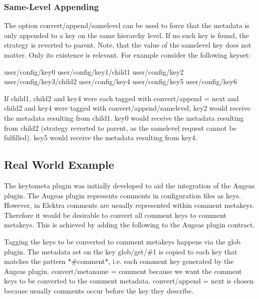 \subsubsection*{Same-\/\+Level Appending}

The option {\ttfamily convert/append/samelevel} can be used to force that the metadata is only appended to a key on the same hierarchy level. If no such key is found, the strategy is reverted to parent. Note, that the value of the samelevel key does not matter. Only its existence is relevant. For example consider the following keyset\+: \begin{DoxyVerb}user/config/key0
user/config/key1/child1
user/config/key2
user/config/key3/child2
user/config/key4
user/config/key5
user/config/key6
\end{DoxyVerb}


If child1, child2 and key4 were each tagged with {\ttfamily convert/append = next} and child2 and key4 were tagged with {\ttfamily convert/append/samelevel}, key2 would receive the metadata resulting from child1. key0 would receive the metadata resulting from child2 (strategy reverted to parent, as the samelevel request cannot be fulfilled). key5 would receive the metadata resulting from key4.

\subsection*{Real World Example}

The keytometa plugin was initially developed to aid the integration of the Augeas plugin. The Augeas plugin represents comments in configuration files as keys. However, in Elektra comments are usually represented within comment metakeys. Therefore it would be desirable to convert all comment keys to comment metakeys. This is achieved by adding the following to the Augeas plugin contract. 


Tagging the keys to be converted to comment metakeys happens via the glob plugin. The metadata set on the key {\ttfamily glob/get/\#1} is copied to each key that matches the pattern {\ttfamily $\ast$\#comment$\ast$}, i.\+e. each comment key generated by the Augeas plugin. {\ttfamily convert/metaname = comment} because we want the comment keys to be converted to the comment metadata. {\ttfamily convert/append = next} is chosen because usually comments occur before the key they describe. 